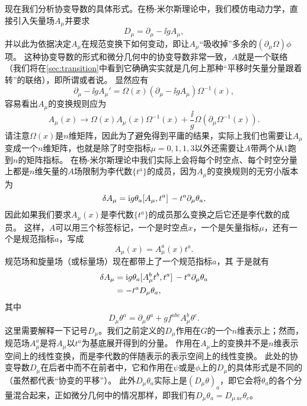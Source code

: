 现在我们分析协变导数的具体形式。在杨-米尔斯理论中，我们模仿电动力学，直接引入矢量场$A_\mu$并要求
\begin{equation}
    D_\mu = \partial_\mu - \ii g A_\mu,
\end{equation}
并以此为依据决定$A_\mu$在规范变换下如何变动，即让$A_\mu$“吸收掉”多余的$(\partial_\mu \Omega) \phi$项。
这种协变导数的形式和微分几何中的协变导数非常一致，$A$就是一个联络（我们将在\autoref{sec:transition}中看到它确确实实就是几何上那种“平移时矢量分量跟着转”的联络），即所谓或者说。
显然应有
\[
    \partial_\mu - \ii g A_\mu' = \Omega(x) (\partial_\mu - \ii g A_\mu) \Omega^{-1}(x),
\]
容易看出$A_\mu$的变换规则应为
\begin{equation}
    A_\mu(x) \to \Omega(x) A_\mu(x) \Omega^{-1}(x) + \frac{\ii}{g} \Omega (\partial_\mu \Omega^{-1}(x)). 
\end{equation}
请注意$\Omega(x)$是$n$维矩阵，因此为了避免得到平庸的结果，实际上我们也需要让$A_\mu$变成一个$n$维矩阵，也就是除了时空指标$\mu=0, 1, 1, 3$以外还需要让$A$带两个从$1$跑到$n$的矩阵指标。
在杨-米尔斯理论中我们实际上会将每个时空点、每个时空分量上都是$n$维矢量的$A$场限制为李代数$\{t^a\}$的成员，因为$A_\mu$的变换规则的无穷小版本为
\[
    \var{A_\mu} = \ii g \theta_a \comm*{A_\mu}{t^a} - t^a \partial_\mu \theta_a,
\]
因此如果我们要求$A_\mu(x)$是李代数$\{t^a\}$的成员那么变换之后它还是李代数的成员。
这样，$A$可以用三个标签标记，一个是时空点$x$，一个是矢量指标$\mu$，还有一个是规范指标$a$，写成
\begin{equation}
    A_\mu(x) = A_\mu^a(x) t^a.
\end{equation}
规范场和旋量场（或标量场）现在都带上了一个规范指标$a$，其
于是就有
\begin{equation}
    \begin{aligned}
        \var{A_\mu} &= \ii g \theta_a \comm*{A_\mu^b t^b}{t^a} - t^a \partial_\mu \theta_a \\
        &= - t^a D_\mu \theta_a,
    \end{aligned}
\end{equation}
其中
\begin{equation}
    D_\mu \theta^a = \partial_\mu \theta^a + g f^{abc} A^b_\mu \theta^c.
\end{equation}
这里需要解释一下记号$D_\mu$。我们之前定义的$D_\mu$作用在$G$的一个$n$维表示上；然而，规范场$A_\mu^a$是将$A_\mu$以$t^a$为基底展开得到的分量。
作用在$A_\mu$上的变换并不是$n$维表示空间上的线性变换，而是李代数的伴随表示的表示空间上的线性变换。
此处的协变导数$D_\mu$在后者中而不在前者中，它和作用在$\psi$或是$\phi$上的$D_\mu$的具体形式是不同的（虽然都代表“协变的平移”）。
此外$D_\mu \theta_a$实际上是$(D_\mu \theta)_a$，即它会将$\theta_a$的各个分量混合起来，正如微分几何中的情况那样，即我们有$D_\mu \theta_a = D_{\mu \ ac} \theta_c$。

